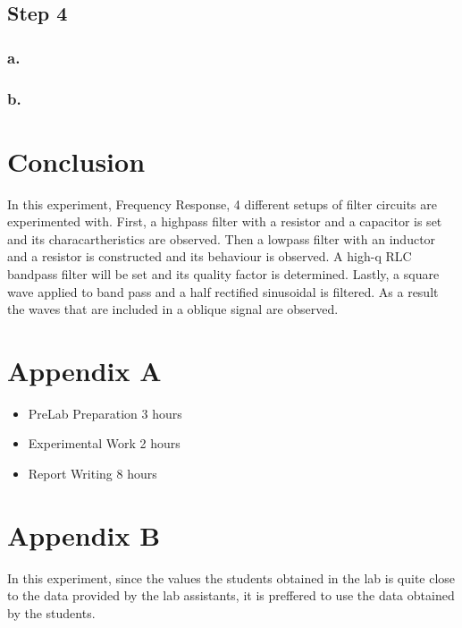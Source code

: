 \documentclass[letterpaper,12pt]{article}
\begin{document}
\subsection{Step 4}
\subsubsection{a.}

\subsubsection{b.}


\section{Conclusion}
In this experiment, Frequency Response, 4 different setups of filter circuits are experimented with. First, a highpass filter with a resistor and a capacitor is set and its characartheristics are observed. Then a lowpass filter with an inductor and a resistor is constructed and its behaviour is observed. A high-q RLC bandpass filter will be set and its quality factor is determined. Lastly, a square wave applied to band pass and a half rectified sinusoidal is filtered. As a result the waves that are included in a oblique signal are observed.


\section*{Appendix A}
\begin{itemize}
    \item PreLab Preparation 3 hours
    \item Experimental Work 2  hours
    \item Report Writing 8 hours
\end{itemize}
\section*{Appendix B}
In this experiment, since the values the students obtained in the lab is quite close to the data provided by the lab assistants, it is preffered to use the data obtained by the students.
\end{document}
